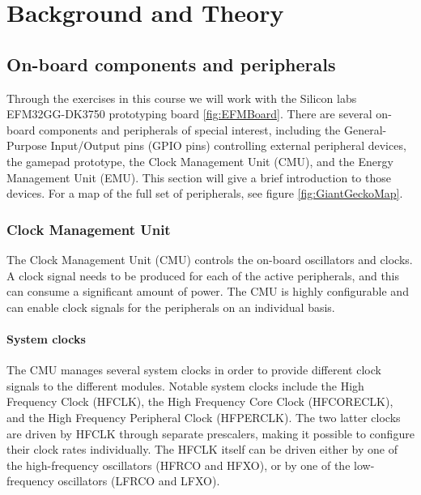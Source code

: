 \chapter{Background and Theory}


\section{On-board components and peripherals}
Through the exercises in this course we will work with the Silicon labs EFM32GG-DK3750 prototyping board \ref{fig:EFMBoard}. There are several on-board components and peripherals of special interest, including the General-Purpose Input/Output pins (GPIO pins) controlling external peripheral devices, the gamepad prototype, the Clock Management Unit (CMU), and the Energy Management Unit (EMU). This section will give a brief introduction to those devices. For a map of the full set of peripherals, see figure \ref{fig:GiantGeckoMap}.


\subsection{Clock Management Unit}\label{subsec:cmu}
The Clock Management Unit (CMU) controls the on-board oscillators and clocks. A clock signal needs to be produced for each of the active peripherals, and this can consume a significant amount of power. The CMU is highly configurable and can enable clock signals for the peripherals on an individual basis.\cite{efm32gg-rm}

\subsubsection{System clocks}
The CMU manages several system clocks in order to provide different clock signals to the different modules. Notable system clocks include the High Frequency Clock (HFCLK), the High Frequency Core Clock (HFCORECLK), and the High Frequency Peripheral Clock (HFPERCLK). The two latter clocks are driven by HFCLK through separate prescalers, making it possible to configure their clock rates individually. The HFCLK itself can be driven either by one of the high-frequency oscillators (HFRCO and HFXO), or by one of the low-frequency oscillators (LFRCO and LFXO). 


